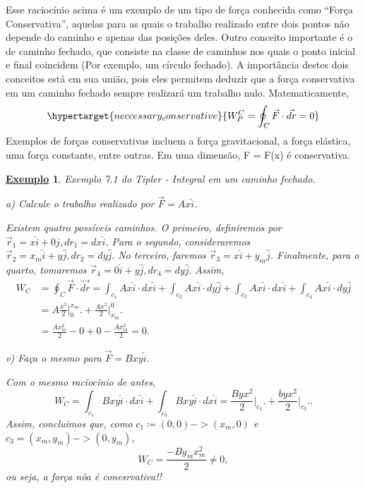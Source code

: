 \documentclass{article}
\newtheorem{example}{\underline{Exemplo}}
\begin{document}
  Esse raciocínio acima é um exemplo de um tipo de for\c ca conhecida como ``For\c ca Conservativa'', aquelas para as quais o trabalho realizado entre dois pontos
  não depende do caminho e apenas das posi\c cões deles.  Outro conceito importante é o de caminho fechado, que consiste na classe de caminhos nos quais o ponto inicial
  e final coincidem (Por exemplo, um círculo fechado). A importância destes dois conceitos está em sua união, pois eles permitem deduzir que a for\c ca conservativa em
  um caminho fechado sempre realizará um trabalho nulo. Matematicamente, 
    \[
      \hypertarget{neccessary_conservative}{W_{P}^{C} = \oint_{C}\vec{F}\cdot \vec{dr} = 0}
    \]
    Exemplos de for\c cas conservativas incluem a for\c ca gravitacional, a for\c ca elástica, uma for\c ca constante, entre outras.
    Em uma dimensão, F = F(x) é conservativa.
   \begin{example}
     Exemplo 7.1 do Tipler - Integral em um caminho fechado.

     a) Calcule o trabalho realizado por \(\vec{F} = Ax \hat{i}\). 

     Existem quatro possíveis caminhos. O primeiro, definiremos por \(\vec{r}_{1} = x\hat{i} + 0\hat{j}, dr_{1} = dx\hat{i}\). Para o segundo, consideraremos
     \(\vec{r}_{2} = x_{m}\hat{i} + y\hat{j}, dr_{2} = dy\hat{j}.\) No terceiro, faremos \(\vec{r}_{3} = x\hat{i} + y_{m}\hat{j}\). Finalmente, para o quarto,
     tomaremos \(\vec{r}_{4} = 0\hat{i} + y\hat{j}, dr_{4} = dy\hat{j}.\) Assim, 
    \begin{align*}
      W_{C} &= \oint_{C}\vec{F}\cdot \vec{dr} = \int_{c_{1}}^{}Ax\hat{i}\cdot dx\hat{i} + \int_{c_{2}}^{}Ax\hat{i}\cdot dy\hat{j} + \int_{c_{3}}^{}Ax\hat{i}\cdot dx\hat{i}+ \int_{c_{4}}^{}Ax\hat{i}\cdot dy\hat{j}\\
            &= A \frac{x^{2}}{2}\biggl|_{0}^{x_{m}}\biggr. + \frac{Ax^{2}}{2}\biggl|_{x_{m}}^{0}\biggr.\\
            &= \frac{Ax_{m}^{2}}{2} - 0 + 0 - \frac{Ax_{m}^{2}}{2} = 0.
    \end{align*}

    v) Fa\c ca o mesmo para \(\vec{F} = Bxy\hat{i}\).

      Com o mesmo raciocínio de antes, 
        \[
          W_{C} = \int_{c_{1}}^{}Bxy\hat{i}\cdot dx\hat{i} + \int_{c_{3}}^{}Bxy\hat{i}\cdot dx\hat{i} = \frac{Byx^{2}}{2}\biggl|_{c_{1}}^{}\biggr. + \frac{byx^{2}}{2}\biggl|_{c_{3}}^{}\biggr. .
        \]
        Assim, concluimos que, como \(c_{1} \coloneqq (0, 0)->(x_{m}, 0)\) e \(c_{3} = (x_{m}, y_{m})->(0, y_{m})\),
          \[
            W_{C} = \frac{-By_{m}x_{m}^{2}}{2}\neq0,
          \]
          ou seja, a for\c ca nõa é conesrvativa!!
   \end{example}
\end{document}
